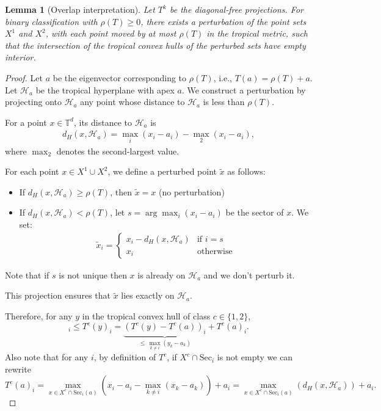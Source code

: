 \documentclass{article}
\newtheorem{lemma}[theorem]{Lemma}
\renewcommand{\geq}{\geqslant}
\newcommand{\trop}{\mathbb{T}}
\begin{document}
\begin{lemma}[Overlap interpretation]\label{lemma:perturbation}
Let $T^k$ be the diagonal-free projections. For binary classification with $\rho(T) \geq 0$, there exists a perturbation of the point sets $X^1$ and $X^2$, with each point moved by at most $\rho(T)$ in the tropical metric, such that the intersection of the tropical convex hulls of the perturbed sets have empty interior.
\end{lemma}
\begin{proof}
Let $a$ be the eigenvector corresponding to $\rho(T)$, i.e., $T(a) = \rho(T) + a$. Let $\mathcal{H}_a$ be the tropical hyperplane with apex $a$. We construct a perturbation by projecting onto $\mathcal{H}_a$ any point whose distance to $\mathcal{H}_a$ is less than $\rho(T)$.

For a point $x \in \trop^d$, its distance to $\mathcal{H}_a$ is
\begin{align}
d_H(x, \mathcal{H}_a) = \max_i(x_i - a_i) - \operatorname{\max}_2(x_i - a_i),
\end{align}
where $\operatorname{\max}_2$ denotes the second-largest value.

For each point $x \in X^1 \cup X^2$, we define a perturbed point $\tilde{x}$ as follows:
\begin{itemize}
\item If $d_H(x, \mathcal{H}_a) \geq \rho(T)$, then $\tilde{x} = x$ (no perturbation)
\item If $d_H(x, \mathcal{H}_a) < \rho(T)$, let $s = \arg\max_i(x_{i} - a_i)$ be the sector of $x$. We set:
  \begin{align}
  \tilde{x}_{i} = \begin{cases}
  x_{i} - d_H(x, \mathcal{H}_a) & \text{if } i = s \\
  x_{i} & \text{otherwise}
  \end{cases}
  \end{align}
\end{itemize}

Note that if $s$ is not unique then $x$ is already on $\mathcal{H}_a$ and we don't perturb it.

This projection ensures that $\tilde{x}$ lies exactly on $\mathcal{H}_a$.

Therefore, for any $y$ in the tropical convex hull of class $c\in\{1,2\}$,
\begin{equation}
[y]_{i}\le T^{c}(y)_{i}=\underbrace{\left(T^{c}(y)-T^{c}(a)\right)_{i}}_{\le\,\max_{k\ne i}(y_{k}-a_{k})}+T^{c}(a)_{i}.\label{eq:major}
\end{equation}
Also note that for any $i$, by definition of $T^{c}$, if $X^c \cap \text{Sec}_i $ is not empty we can rewrite
\begin{equation}
T^{c}(a)_{i}=\max_{x \in {X^c \cap \text{Sec}_i(a)}}\left(x_{i}-a_{i} - \max_{k\neq i} (x_{k}-a_{k})\right)  + a_i = \max_{x \in {X^c \cap \text{Sec}_i(a)}}(d_{H}\left(x,\mathcal{H}_{a}\right)) + a_i  .\label{eq:rewrite}
\end{equation}


\end{proof}
\end{document}
